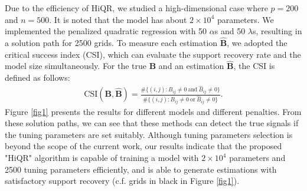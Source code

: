 \documentclass[preprint,authoryear,11pt]{elsarticle}
\newcommand{\B}{\mathbf B}
\begin{document}
Due to the efficiency of HiQR, we studied a high-dimensional case where $p=200$ and $n=500$. It is noted that the model has about { $2\times 10^4$ parameters}. We implemented the penalized quadratic regression with 50 $\alpha$s and 50 $\lambda$s, resulting in a solution path for 2500 grids. To measure each estimation $\widehat{\B}$, we adopted the critical success index (CSI), which can evaluate the support recovery rate and the model size simultaneously. For the true $\B$ and an estimation $\widehat{\B}$, the CSI is defined as follows:
\begin{align*}
	\mbox{CSI}(\B,\widehat{\B})=\frac{\#\{(i,j): B_{ij} \neq 0~\mbox{and}~\hat{B}_{ij} \neq 0 \}}{\#\{(i,j): B_{ij} \neq 0~\mbox{or}~\hat{B}_{ij} \neq 0 \}}.
\end{align*}
Figure \ref{fig1} presents the results for different models and different penalties.  From these solution paths, we can see that these methods can detect the true signals if the tuning parameters are set suitably. 
{Although tuning parameters selection is beyond the scope of the current work, our results indicate that the proposed "HiQR" algorithm is capable of training a model with $2 \times 10^4$ parameters and 2500 tuning parameters efficiently, and is able to generate estimations with satisfactory support recovery (c.f. grids in black in Figure \ref{fig1}). 
} 
\end{document}
